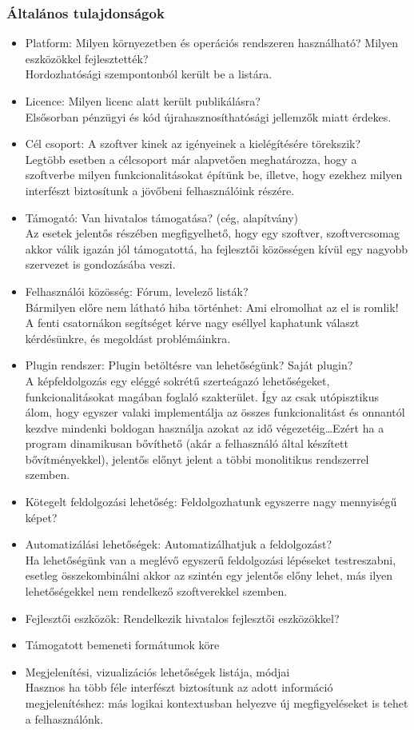 \documentclass[a4paper,12pt,oneside]{report}
\begin{document}
\subsubsection{Általános tulajdonságok}
\begin{itemize}
	\itemsep0em
	\item Platform: Milyen környezetben és operációs rendszeren használható? Milyen eszközökkel fejlesztették? \\Hordozhatósági szempontonból került be a listára.
	\item Licence: Milyen licenc alatt került publikálásra?\\Elsősorban pénzügyi és kód újrahasznosíthatósági jellemzők miatt érdekes.
	\item Cél csoport: A szoftver kinek az igényeinek a kielégítésére törekszik?\\Legtöbb esetben a célcsoport már alapvetően meghatározza, hogy a szoftverbe milyen funkcionalitásokat építünk be, illetve, hogy ezekhez milyen interfészt biztosítunk a jövőbeni felhasználóink részére.
	\item Támogató: Van hivatalos támogatása? (cég, alapítvány)\\Az esetek jelentős részében megfigyelhető, hogy egy szoftver, szoftvercsomag akkor válik igazán jól támogatottá, ha fejlesztői közösségen kívül egy nagyobb szervezet is gondozásába veszi.
	\item Felhasználói közösség: Fórum, levelező listák?\\Bármilyen előre nem látható hiba történhet: Ami elromolhat az el is romlik! A fenti csatornákon segítséget kérve nagy eséllyel kaphatunk választ kérdésünkre, és megoldást problémáinkra.
	\item Plugin rendszer: Plugin betöltésre van lehetőségünk? Saját plugin?\\A képfeldolgozás egy eléggé sokrétű szerteágazó lehetőségeket, funkcionalitásokat magában foglaló szakterület. Így az csak utópisztikus álom, hogy egyszer valaki implementálja az összes funkcionalitást és onnantól kezdve mindenki boldogan használja azokat az idő végezetéig\dots Ezért ha a program dinamikusan bővíthető (akár a felhasználó által készített bővítményekkel), jelentős előnyt jelent a többi monolitikus rendszerrel szemben.
	\item Kötegelt feldolgozási lehetőség: Feldolgozhatunk egyszerre nagy mennyiségű képet?
	\item Automatizálási lehetőségek: Automatizálhatjuk a feldolgozást?\\Ha lehetőségünk van a meglévő egyszerű feldolgozási lépéseket testreszabni, esetleg összekombinálni akkor az szintén egy jelentős előny lehet, más ilyen lehetőségekkel nem rendelkező szoftverekkel szemben.
	\item Fejlesztői eszközök: Rendelkezik hivatalos fejlesztői eszközökkel?
	\item Támogatott bemeneti formátumok köre
	\item Megjelenítési, vizualizációs lehetőségek listája, módjai\\Hasznos ha több féle interfészt biztosítunk az adott információ megjelenítéshez: más logikai kontextusban helyezve új megfigyeléseket is tehet a felhasználónk.


\end{itemize}
\end{document}
